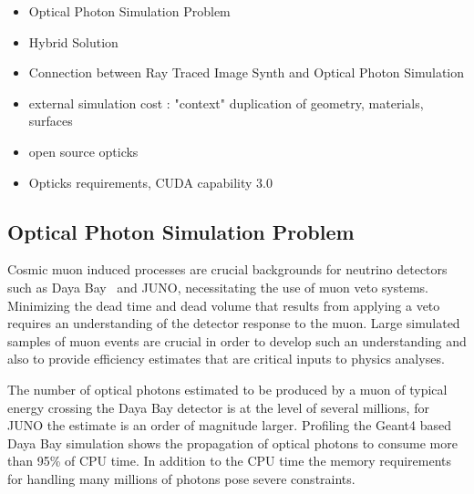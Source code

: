 \documentclass[a4paper]{jpconf}
\begin{document}
\begin{itemize}
\item Optical Photon Simulation Problem
\item Hybrid Solution
\item Connection between Ray Traced Image Synth and Optical Photon Simulation
\item external simulation cost : "context" duplication of geometry, materials, surfaces
\item open source opticks\cite{opticksURL} \cite{newton}
\item Opticks requirements, CUDA capability 3.0
\end{itemize}

\subsection{Optical Photon Simulation Problem}


Cosmic muon induced processes are crucial backgrounds for neutrino
detectors such as Daya Bay~\cite{dyb} and JUNO\cite{juno}, 
necessitating the use of muon veto systems.
Minimizing the dead time and dead volume that results from applying 
a veto requires an understanding of the detector response to the muon.
Large simulated samples of muon events are crucial in order to 
develop such an understanding and also to provide efficiency estimates 
that are critical inputs to physics analyses.

The number of optical photons estimated to be produced by a muon of 
typical energy crossing the Daya Bay detector is at the level of several millions, 
for JUNO the estimate is an order of magnitude larger. 
Profiling the Geant4 based Daya Bay simulation 
shows the propagation of optical photons to consume more than 95\% of CPU time. 
In addition to the CPU time the memory requirements for handling many millions 
of photons pose severe constraints.  


\end{document}
